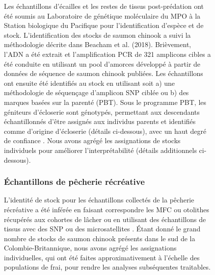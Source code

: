 \begin{figure}[H]
Les échantillons d'écailles et les restes de tissus post-prédation ont été soumis au Laboratoire de génétique moléculaire du MPO à la Station biologique du Pacifique pour l'identification d'espèce et de stock. L'identification des stocks de saumon chinook a suivi la méthodologie décrite dans Beacham et al. (2018)\nocite{beachamParentagebasedTaggingGenetic2022}. Brièvement, l'ADN a été extrait et l'amplification PCR de 321 amplicons cibles a été conduite en utilisant un pool d'amorces développé à partir de données de séquence de saumon chinook publiées. Les échantillons ont ensuite été identifiés au stock en utilisant soit a) une méthodologie de séquençage d'amplicon SNP ciblée ou b) des marques basées sur la parenté (PBT). Sous le programme PBT, les géniteurs d'écloserie sont génotypés, permettant aux descendants échantillonnés d'être assignés aux individus parents et identifiés comme d'origine d'écloserie (détails ci-dessous), avec un haut degré de confiance \citep{beachamParentagebasedTaggingGenetic2022}. Nous avons agrégé les assignations de stocks individuels pour améliorer l'interprétabilité (détails additionnels ci-dessous).

\subsubsection{Échantillons de pêcherie récréative}

L'identité de stock pour les échantillons collectés de la pêcherie récréative a été inférée en faisant correspondre les MFC ou otolithes récupérés aux cohortes de lâcher ou en utilisant des échantillons de tissus avec des SNP ou des microsatellites \citep{beachamPacificRimPopulation2006a, beachamParentagebasedTaggingGenetic2022}. Étant donné le grand nombre de stocks de saumon chinook présents dans le sud de la Colombie-Britannique, nous avons agrégé les assignations individuelles, qui ont été faites approximativement à l'échelle des populations de frai, pour rendre les analyses subséquentes traitables.


\end{figure}
